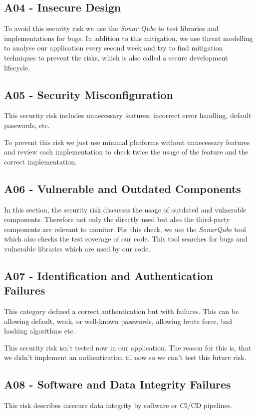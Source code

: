 
\subsection{A04 - Insecure Design}
To avoid this security risk we use the \textit{Sonar Qube} to test libraries and implementations for bugs. In addition to this mitigation, we use threat modelling to analyse our application every second week and try to find mitigation techniques to prevent the risks, which is also called a secure development lifecycle.

\subsection{A05 - Security Misconfiguration}
This security risk includes unnecessary features, incorrect error handling, default passwords, etc.

To prevent this risk we just use minimal platforms without unnecessary features and review each implementation to check twice the usage of the feature and the correct implementation.

\subsection{A06 - Vulnerable and Outdated Components}
In this section, the security risk discusses the usage of outdated and vulnerable components. Therefore not only the directly used but also the third-party components are relevant to monitor. For this check, we use the \textit{SonarQube} tool which also checks the test coverage of our code. This tool searches for bugs and vulnerable libraries which are used by our code.

\subsection{A07 - Identification and Authentication Failures}
This category defined a correct authentication but with failures. This can be allowing default, weak, or well-known passwords, allowing brute force, bad hashing algorithms etc.

This security risk isn't tested now in our application. The reason for this is, that we didn't implement an authentication til now so we can't test this future risk.

\subsection{A08 - Software and Data Integrity Failures}
This risk describes insecure data integrity by software or CI/CD pipelines.

